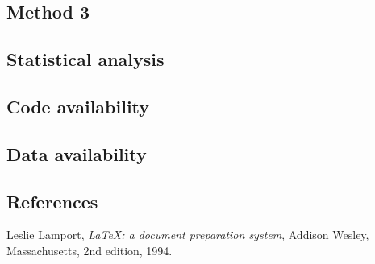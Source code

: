 \documentclass[twocolumn, linenumbers, superscriptaddress]{revtex4-1}
\begin{document}
		\subsection*{Method 3}
			\blindtext[3]
			
		\subsection*{Statistical analysis}
			\blindtext[3]
			
		\subsection*{Code availability}
			\blindtext[3]
			
		\subsection*{Data availability}
			\blindtext[3]

	\begin{thebibliography}{50}
		\section*{References}	
			Leslie Lamport,
			\textit{\LaTeX: a document preparation system},
			Addison Wesley, Massachusetts,
			2nd edition,
			1994.

	\end{thebibliography}
\end{document}
